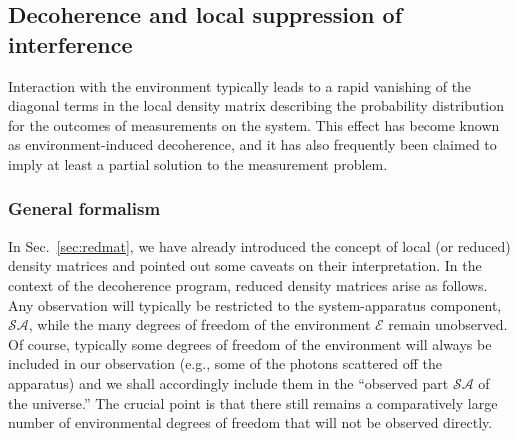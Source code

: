 \documentclass[rmp,aps,amsmath,amsfonts,noshowkeys,noshowpacs,12pt]{revtex4}
\begin{document}
\subsection{Decoherence and local suppression of interference \label{sec:interf}}

Interaction with the environment typically leads to a rapid vanishing
of the diagonal terms in the local density matrix describing the
probability distribution for the outcomes of measurements on the
system. This effect has become known as environment-induced
decoherence, and it has also frequently been claimed to imply at
least a partial solution to the measurement problem.

\subsubsection{General formalism}

In Sec.~\ref{sec:redmat}, we have already introduced the concept of
local (or reduced) density matrices and pointed out some caveats on
their interpretation.  In the context of the decoherence program,
reduced density matrices arise as follows. Any observation will
typically be restricted to the system-apparatus component,
$\mathcal{SA}$, while the many degrees of freedom of the environment
$\mathcal{E}$ remain unobserved. Of course, typically some degrees of
freedom of the environment will always be included in our observation
(e.g., some of the photons scattered off the apparatus) and we shall
accordingly include them in the ``observed part $\mathcal{SA}$ of the
universe.''  The crucial point is that there still remains a
comparatively large number of environmental degrees of freedom that will
not be observed directly.
\end{document}
